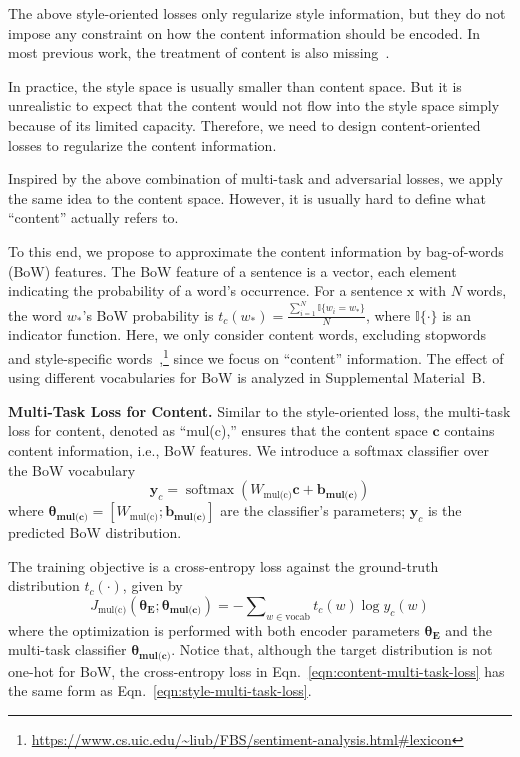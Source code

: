 \documentclass[11pt,a4paper]{article}
\newcommand{\rmx}{\mathrm x}
\newcommand{\loss}[1]{J_{\text{#1}}}
\newcommand{\nnweight}[1]{\bm{\theta_{\text{#1}}}}
\newcommand{\weight}[1]{W_{\text{#1}}}
\newcommand{\bias}[1]{\bm{b_{\text{#1}}}}
\begin{document}
The above style-oriented losses only regularize style information, but they do not impose any constraint on how the content information should be encoded. In most previous work, the treatment of content is also missing~\cite{hu2017toward,shen2017style,fu2018style}.

In practice, the style space is usually smaller than content space. But it is unrealistic to expect that the content would not flow into the style space simply because of its limited capacity. Therefore, we need to design content-oriented losses to regularize the content information.

Inspired by the above combination of multi-task and adversarial losses, we apply the same idea to the content space. However, it is usually hard to define what ``content'' actually refers to.

To this end, we propose to approximate the content information by bag-of-words (BoW) features.
The BoW feature of a sentence is a vector, each element indicating the probability of a word's occurrence.
For a sentence $\rmx$ with $N$ words, the word $w_*$'s BoW probability is
$t_c(w_*)=\frac{\sum_{i=1}^{N}{\mathbb{I}\{w_i = w_*\}}}{N}$,
where $\mathbb{I\{\cdot\}}$ is an indicator function.
Here, we only consider content words, excluding stopwords and style-specific words~\cite{hu2004mining},\footnote{\url{https://www.cs.uic.edu/~liub/FBS/sentiment-analysis.html\#lexicon}} since we focus on ``content'' information.
The effect of using different vocabularies for BoW is analyzed in Supplemental Material~B.

\textbf{Multi-Task Loss for Content.} Similar to the style-oriented loss, the multi-task loss for content, denoted as ``mul(c),'' ensures that the content space $\bm c$ contains content information, i.e., BoW features.
We introduce a softmax classifier over the BoW vocabulary
\begin{equation} \label{eqn:bow-pred}
	\bm y_c = \operatorname{softmax}({\weight{mul(c)}} \bm c + \bias{mul(c)})
\end{equation}
where $\nnweight{mul(c)}\!\!=\!\![\weight{mul(c)}; \bias{mul(c)}]$ are the classifier's parameters; $\bm y_c$ is the predicted BoW distribution.

The training objective is a cross-entropy loss against the ground-truth distribution $t_c(\cdot)$, given by
\begin{equation}\label{eqn:content-multi-task-loss}
	\loss{mul(c)}(\nnweight{E};\nnweight{mul(c)}) = -\!\! \sum\nolimits_{w\in\text{vocab}}\!\! t_c(w)\log y_c(w)
\end{equation}
where the optimization is performed with both encoder parameters $\nnweight{E}$ and the multi-task classifier $\nnweight{mul(c)}$.
Notice that, although the target distribution is not one-hot  for BoW, the cross-entropy loss in Eqn.~\ref{eqn:content-multi-task-loss} has the same form as Eqn.~\ref{eqn:style-multi-task-loss}.
\end{document}
